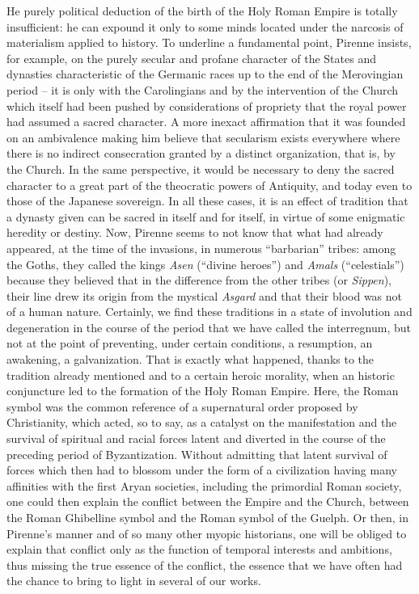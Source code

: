 He purely political deduction of the birth of the Holy Roman Empire is totally insufficient: he can expound it only to some minds located under the narcosis of materialism applied to history. To underline a fundamental point, Pirenne insists, for example, on the purely secular and profane character of the States and dynasties characteristic of the Germanic races up to the end of the Merovingian period -- it is only with the Carolingians and by the intervention of the Church which itself had been pushed by considerations of propriety that the royal power had assumed a sacred character. A more inexact affirmation that it was founded on an ambivalence making him believe that secularism exists everywhere where there is no indirect consecration granted by a distinct organization, that is, by the Church. In the same perspective, it would be necessary to deny the sacred character to a great part of the theocratic powers of Antiquity, and today even to those of the Japanese sovereign. In all these cases, it is an effect of tradition that a dynasty given can be sacred in itself and for itself, in virtue of some enigmatic heredity or destiny. Now, Pirenne seems to not know that what had already appeared, at the time of the invasions, in numerous ``barbarian'' tribes: among the Goths, they called the kings \emph{Asen} (``divine heroes'') and \emph{Amals} (``celestials'') because they believed that in the difference from the other tribes (or \emph{Sippen}), their line drew its origin from the mystical \emph{Asgard} and that their blood was not of a human nature. Certainly, we find these traditions in a state of involution and degeneration in the course of the period that we have called the interregnum, but not at the point of preventing, under certain conditions, a resumption, an awakening, a galvanization. That is exactly what happened, thanks to the tradition already mentioned and to a certain heroic morality, when an historic conjuncture led to the formation of the Holy Roman Empire. Here, the Roman symbol was the common reference of a supernatural order proposed by Christianity, which acted, so to say, as a catalyst on the manifestation and the survival of spiritual and racial forces latent and diverted in the course of the preceding period of Byzantization. Without admitting that latent survival of forces which then had to blossom under the form of a civilization having many affinities with the first Aryan societies, including the primordial Roman society, one could then explain the conflict between the Empire and the Church, between the Roman Ghibelline symbol and the Roman symbol of the Guelph. Or then, in Pirenne's manner and of so many other myopic historians, one will be obliged to explain that conflict only as the function of temporal interests and ambitions, thus missing the true essence of the conflict, the essence that we have often had the chance to bring to light in several of our works.


